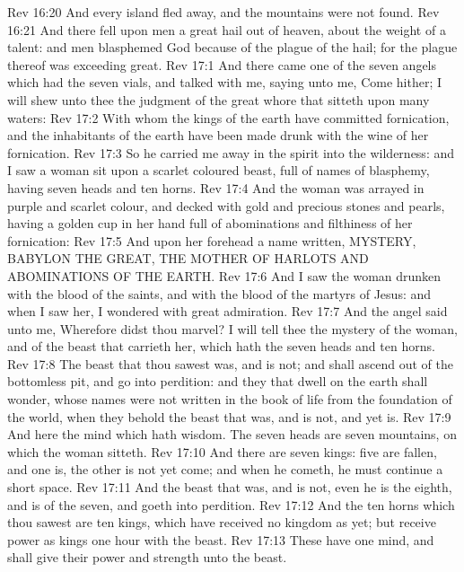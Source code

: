 \vs Rev 16:20 And every island fled away, and the mountains were not found.
\vs Rev 16:21 And there fell upon men a great hail out of heaven,  about the weight of a talent: and men blasphemed God because of the plague of the hail; for the plague thereof was exceeding great.
\vs Rev 17:1 And there came one of the seven angels which had the seven vials, and talked with me, saying unto me, Come hither; I will shew unto thee the judgment of the great whore that sitteth upon many waters:
\vs Rev 17:2 With whom the kings of the earth have committed fornication, and the inhabitants of the earth have been made drunk with the wine of her fornication.
\vs Rev 17:3 So he carried me away in the spirit into the wilderness: and I saw a woman sit upon a scarlet coloured beast, full of names of blasphemy, having seven heads and ten horns.
\vs Rev 17:4 And the woman was arrayed in purple and scarlet colour, and decked with gold and precious stones and pearls, having a golden cup in her hand full of abominations and filthiness of her fornication:
\vs Rev 17:5 And upon her forehead  a name written, MYSTERY, BABYLON THE GREAT, THE MOTHER OF HARLOTS AND ABOMINATIONS OF THE EARTH.
\vs Rev 17:6 And I saw the woman drunken with the blood of the saints, and with the blood of the martyrs of Jesus: and when I saw her, I wondered with great admiration.
\vs Rev 17:7 And the angel said unto me, Wherefore didst thou marvel? I will tell thee the mystery of the woman, and of the beast that carrieth her, which hath the seven heads and ten horns.
\vs Rev 17:8 The beast that thou sawest was, and is not; and shall ascend out of the bottomless pit, and go into perdition: and they that dwell on the earth shall wonder, whose names were not written in the book of life from the foundation of the world, when they behold the beast that was, and is not, and yet is.
\vs Rev 17:9 And here  the mind which hath wisdom. The seven heads are seven mountains, on which the woman sitteth.
\vs Rev 17:10 And there are seven kings: five are fallen, and one is,  the other is not yet come; and when he cometh, he must continue a short space.
\vs Rev 17:11 And the beast that was, and is not, even he is the eighth, and is of the seven, and goeth into perdition.
\vs Rev 17:12 And the ten horns which thou sawest are ten kings, which have received no kingdom as yet; but receive power as kings one hour with the beast.
\vs Rev 17:13 These have one mind, and shall give their power and strength unto the beast.
